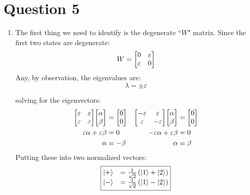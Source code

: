 \documentclass[11pt]{article}
\begin{document}
\newpage

\section*{Question 5}

\begin{enumerate}[label=\alph*)]
\item
The first thing we need to identify is the degenerate ``$W$" matrix. Since the first two states are degenerate:
\[W = \mqty[0 & \varepsilon \\ \varepsilon & 0]\]
Any, by observation, the eigenvalues are:
\[\lambda = \pm \varepsilon\]

solving for the eigenvectors:
\begin{align*}
\mqty[\varepsilon & \varepsilon \\ \varepsilon & \varepsilon] \mqty[\alpha \\ \beta] & = \mqty[0\\0] & \mqty[-\varepsilon & \varepsilon \\ \varepsilon & -\varepsilon] \mqty[\alpha \\ \beta] & = \mqty[0\\0]\\
\varepsilon \alpha + \varepsilon \beta & = 0 & -\varepsilon \alpha + \varepsilon\beta & = 0\\
\alpha & =-\beta & \alpha & = \beta
\end{align*}
Putting these into two normalized vectors:
\[\boxed{\mqty{\ket{+} & = \frac{1}{\sqrt{2}}\left(\ket{1}+\ket{2}\right) \\ \ket{-} & = \frac{1}{\sqrt{2}}\left(\ket{1}-\ket{2}\right) }}\]


\end{enumerate}
\end{document}
